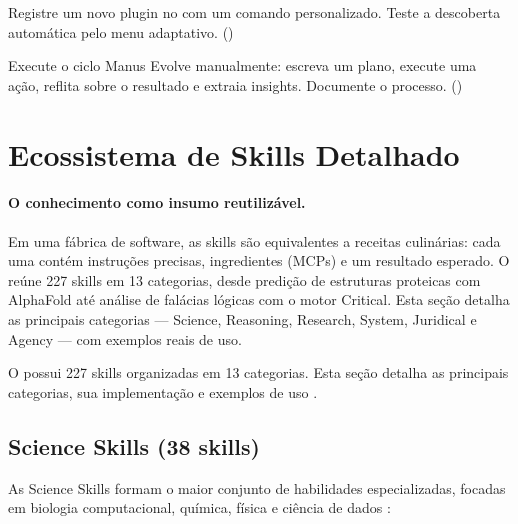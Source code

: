 \begin{exercicio}
Registre um novo plugin no  com um comando
personalizado. Teste a descoberta automática pelo menu adaptativo.
(\nivelintermediario)
\end{exercicio}

\begin{exercicio}
Execute o ciclo Manus Evolve manualmente: escreva um plano, execute uma
ação, reflita sobre o resultado e extraia insights. Documente o processo.
(\nivelavancado)
\end{exercicio}

\section{Ecossistema de Skills Detalhado}
\label{sec:skills-detalhado}
\nivelavancado

\paragraph{O conhecimento como insumo reutilizável.} Em uma fábrica de software, as skills são equivalentes a receitas culinárias: cada uma contém instruções precisas, ingredientes (MCPs) e um resultado esperado. O \opencodeeco{} reúne 227 skills em 13 categorias, desde predição de estruturas proteicas com AlphaFold até análise de falácias lógicas com o motor Critical. Esta seção detalha as principais categorias — Science, Reasoning, Research, System, Juridical e Agency — com exemplos reais de uso.

O \opencodeeco{} possui 227 skills organizadas em 13 categorias. Esta
seção detalha as principais categorias, sua implementação e exemplos
de uso \cite{white2023prompt, wei2022chain, wang2024survey}.

\subsection{Science Skills (38 skills)}
\label{subsec:science-skills}

As Science Skills formam o maior conjunto de habilidades especializadas,
focadas em biologia computacional, química, física e ciência de dados
\cite{opencode2026ecosystem}:

